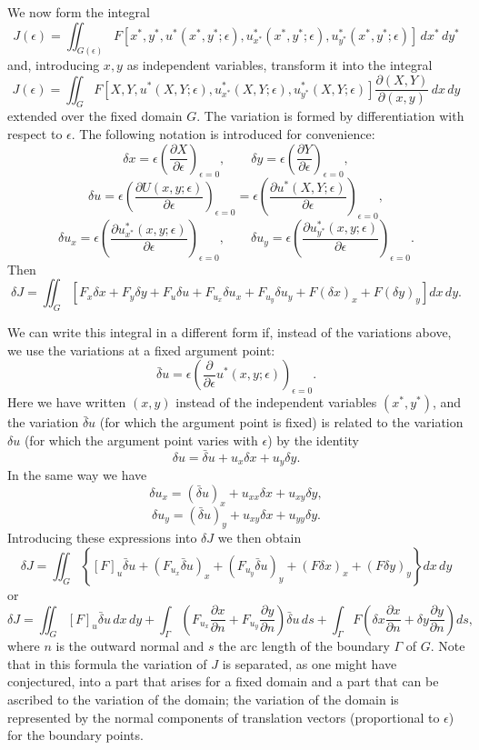 We now form the integral
\[
J(\epsilon)=\iint_{G(\epsilon)}F[x^*,y^*,u^*(x^*,y^*;\epsilon),u^*_{x^*}(x^*,y^*;\epsilon),u^*_{y^*}(x^*,y^*;\epsilon)]\,dx^*\,dy^*
\]
and, introducing $x,y$ as independent variables, transform it into the integral
\[
J(\epsilon)=\iint_G F[X,Y,u^*(X,Y;\epsilon),u^*_{x^*}(X,Y;\epsilon),u^*_{y^*}(X,Y;\epsilon)]
\frac{\partial(X,Y)}{\partial(x,y)}\,dx\,dy
\]
extended over the fixed domain $G$. The variation is formed by differentiation with respect to $\epsilon$. The following notation is introduced for convenience:
\[
\delta x=\epsilon\left(\frac{\partial X}{\partial\epsilon}\right)_{\epsilon=0},\qquad
\delta y=\epsilon\left(\frac{\partial Y}{\partial\epsilon}\right)_{\epsilon=0},
\]
\[
\delta u=\epsilon\left(\frac{\partial U(x,y;\epsilon)}{\partial\epsilon}\right)_{\epsilon=0}
=\epsilon\left(\frac{\partial u^*(X,Y;\epsilon)}{\partial\epsilon}\right)_{\epsilon=0},
\]
\[
\delta u_x=\epsilon\left(\frac{\partial u^*_{x^*}(x,y;\epsilon)}{\partial\epsilon}\right)_{\epsilon=0},\qquad
\delta u_y=\epsilon\left(\frac{\partial u^*_{y^*}(x,y;\epsilon)}{\partial\epsilon}\right)_{\epsilon=0}.
\]
Then
\[
\delta J=\iint_G\left[F_x\delta x+F_y\delta y+F_u\delta u+F_{u_x}\delta u_x+F_{u_y}\delta u_y+F(\delta x)_x+F(\delta y)_y\right]dx\,dy.
\]

We can write this integral in a different form if, instead of the variations above, we use the variations at a fixed argument point:
\[
\bar\delta u=\epsilon\left(\frac{\partial}{\partial\epsilon}u^*(x,y;\epsilon)\right)_{\epsilon=0}.
\]
Here we have written $(x,y)$ instead of the independent variables $(x^*,y^*)$, and the variation $\bar\delta u$ (for which the argument point is fixed) is related to the variation $\delta u$ (for which the argument point varies with $\epsilon$) by the identity
\begin{equation}\tag{105}
\delta u=\bar\delta u+u_x\delta x+u_y\delta y.
\end{equation}
In the same way we have
\[
\delta u_x=(\bar\delta u)_x+u_{xx}\delta x+u_{xy}\delta y,
\]
\[
\delta u_y=(\bar\delta u)_y+u_{xy}\delta x+u_{yy}\delta y.
\]
Introducing these expressions into $\delta J$ we then obtain
\[
\delta J=\iint_G\left\{[F]_u\bar\delta u+(F_{u_x}\bar\delta u)_x+(F_{u_y}\bar\delta u)_y+(F\delta x)_x+(F\delta y)_y\right\}dx\,dy
\]
or
\[
\delta J=\iint_G[F]_u\bar\delta u\,dx\,dy
+\int_\Gamma\left(F_{u_x}\frac{\partial x}{\partial n}+F_{u_y}\frac{\partial y}{\partial n}\right)\bar\delta u\,ds
+\int_\Gamma F\left(\delta x\frac{\partial x}{\partial n}+\delta y\frac{\partial y}{\partial n}\right)ds,
\]
where $n$ is the outward normal and $s$ the arc length of the boundary $\Gamma$ of $G$. Note that in this formula the variation of $J$ is separated, as one might have conjectured, into a part that arises for a fixed domain and a part that can be ascribed to the variation of the domain; the variation of the domain is represented by the normal components of translation vectors (proportional to $\epsilon$) for the boundary points.

